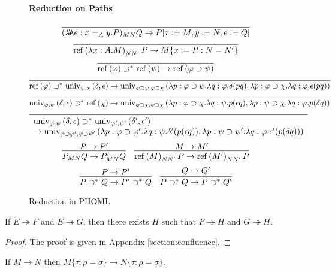 \documentclass[a4paper,UKenglish]{lipics-v2016}
\newcommand*{\reff}[1]{\ensuremath{\mathrm{ref} \left( {#1} \right)}}
\newcommand*{\univ}[4]{\ensuremath{\mathrm{univ}_{{#1}, {#2}} \left({#3} , {#4} \right)}}
\newcommand*{\triplelambda}{\ensuremath{\lambda \!\! \lambda \!\! \lambda}}
\theoremstyle{plain}
\theoremstyle{definition}
\begin{document}
\begin{definition}
\begin{figure}
\paragraph*{Reduction on Paths}
$$\infer{(\triplelambda e:x =_A y.P)_{MN} Q \rightarrow P [x := M, y := N, e := Q]}{} $$
$$ \infer{\reff{\lambda x:A.M}_{N N'} P \rightarrow M \{ x:=P : N = N' \}}{} $$
$$ \infer{\reff{\varphi} \supset^* \reff{\psi} \rightarrow \reff{\varphi \supset \psi}}{} $$
$$ \infer{\reff{\varphi} \supset^* \univ{\psi}{\chi}{\delta}{\epsilon} \rightarrow 
\univ{\varphi \supset \psi}{\varphi \supset \chi}{\lambda p:\varphi \supset \psi. \lambda q : \varphi. \delta (pq)}{\lambda p : \varphi \supset \chi. \lambda q : \varphi. \epsilon (pq)}}{} $$
$$ \infer{\univ{\varphi}{\psi}{\delta}{\epsilon} \supset^* \reff{\chi} \rightarrow
\univ{\varphi \supset \chi}{\psi \supset \chi}{\lambda p : \varphi \supset \chi. \lambda q : \psi. p (\epsilon q)}{\lambda p:\psi \supset \chi. \lambda q : \varphi. p(\delta q)}}{} $$
$$ \infer{\begin{array}{l}
\univ{\varphi}{\psi}{\delta}{\epsilon} \supset^* \univ{\varphi'}{\psi'}{\delta'}{\epsilon'} \\
 \rightarrow
\univ{\varphi \supset \varphi'}{\psi \supset \psi'}{\lambda p : \varphi \supset \varphi'. \lambda q : \psi. \delta' (p(\epsilon q))}{\lambda p : \psi \supset \psi'. \lambda q : \varphi. \epsilon' (p (\delta q))}
\end{array}}{} $$
$$ \infer{P_{MN} Q \rightarrow P'_{MN} Q}{P \rightarrow P'} \quad
\infer{\reff{M}_{NN'}P \rightarrow \reff{M'}_{NN'}P}{M \rightarrow M'} $$
$$ \infer{P \supset^* Q \rightarrow P' \supset^* Q}{P \rightarrow P'} \quad
\infer{P \supset^* Q \rightarrow P \supset^* Q'}{Q \rightarrow Q'} $$
\caption{Reduction in PHOML}
\label{fig:reduction}
\end{figure}
\end{definition}

\begin{lemma}[Confluence]
\label{lm:diamond}
If $E \twoheadrightarrow F$ and $E \twoheadrightarrow G$, then there exists $H$ such that $F \twoheadrightarrow H$ and $G \twoheadrightarrow H$.
\end{lemma}

\begin{proof}
The proof is given in Appendix \ref{section:confluence}.
\end{proof}

\begin{lemma}
\label{lm:resp-sub}
If $M \rightarrow N$ then $M \{ \tau : \rho = \sigma \} \rightarrow N \{ \tau : \rho = \sigma \}$.
\end{lemma}
\end{document}
